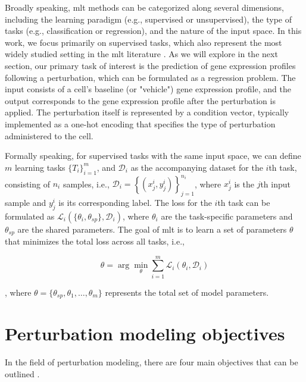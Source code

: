 \documentclass[12pt, a4paper]{article}
\begin{document}
Broadly speaking, \gls{mlt} methods can be categorized along several dimensions, including the learning paradigm (e.g., supervised or unsupervised), the type of tasks (e.g., classification or regression), and the nature of the input space. In this work, we focus primarily on supervised tasks, which also represent the most widely studied setting in the \gls{mlt} literature \cite{zhangSurveyMultiTaskLearning2021}.
As we will explore in the next section, our primary task of interest is the prediction of gene expression profiles following a perturbation, which can be formulated as a regression problem. The input consists of a cell’s baseline (or "vehicle") gene expression profile, and the output corresponds to the gene expression profile after the perturbation is applied. The perturbation itself is represented by a condition vector, typically implemented as a one-hot encoding that specifies the type of perturbation administered to the cell.

Formally speaking, for supervised tasks with the same input space, we can define $m$ learning tasks $\{T_{i}\}_{i=1}^m$, and $\mathcal{D}_i$ as the accompanying dataset for the $i$th task, consisting of $n_i$ samples, i.e., $\mathcal{D}_i = \left\{(x_j^i, y_j^i)\right\}_{j=1}^{n_i}$, where $x_j^i$ is the $j$th input sample and $y_j^i$ is its corresponding label.
The loss for the $i$th task can be formulated as $\mathcal{L}_i(\{\theta_i, \theta_{sp}\}, \mathcal{D}_i)$, where $\theta_i$ are the task-specific parameters and $\theta_{sp}$ are the shared parameters.
The goal of \gls{mlt} is to learn a set of parameters $\theta$ that minimizes the total loss across all tasks, i.e.,

\[
\theta = \arg\min_{\theta} \sum_{i=1}^m \mathcal{L}_i(\theta_i, \mathcal{D}_i)
\]

, where $\theta = \{\theta_{sp}, \theta_1, \dots, \theta_m\}$ represents the total set of model parameters.
% 


\section{Perturbation modeling objectives}

In the field of perturbation modeling, there are four main objectives that can be outlined \cite{gavriilidisMinireviewPerturbationModelling2024, jiMachineLearningPerturbational2021, heumos2023best}.
\end{document}
